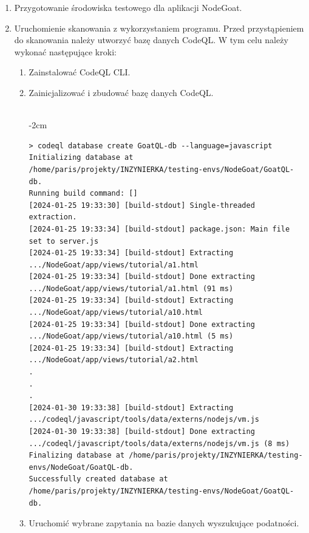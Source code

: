 \begin{enumerate}
    \item Przygotowanie środowiska testowego dla aplikacji NodeGoat.
    
    

    \item Uruchomienie skanowania z wykorzystaniem programu.
    Przed przystąpieniem do skanowania należy utworzyć bazę danych CodeQL. W tym celu należy wykonać następujące kroki:
    \begin{enumerate}
        \item Zainstalować CodeQL CLI.
        \item Zainicjalizować i zbudować bazę danych CodeQL. \\\\
        \scriptsize
        \begin{adjustwidth}
        {-2cm}{}
        \begin{verbatim}
> codeql database create GoatQL-db --language=javascript  
Initializing database at /home/paris/projekty/INZYNIERKA/testing-envs/NodeGoat/GoatQL-db.
Running build command: []
[2024-01-25 19:33:30] [build-stdout] Single-threaded extraction.
[2024-01-25 19:33:34] [build-stdout] package.json: Main file set to server.js
[2024-01-25 19:33:34] [build-stdout] Extracting .../NodeGoat/app/views/tutorial/a1.html
[2024-01-25 19:33:34] [build-stdout] Done extracting .../NodeGoat/app/views/tutorial/a1.html (91 ms)
[2024-01-25 19:33:34] [build-stdout] Extracting .../NodeGoat/app/views/tutorial/a10.html
[2024-01-25 19:33:34] [build-stdout] Done extracting .../NodeGoat/app/views/tutorial/a10.html (5 ms)
[2024-01-25 19:33:34] [build-stdout] Extracting .../NodeGoat/app/views/tutorial/a2.html
.
.
.
[2024-01-30 19:33:38] [build-stdout] Extracting .../codeql/javascript/tools/data/externs/nodejs/vm.js
[2024-01-30 19:33:38] [build-stdout] Done extracting .../codeql/javascript/tools/data/externs/nodejs/vm.js (8 ms)
Finalizing database at /home/paris/projekty/INZYNIERKA/testing-envs/NodeGoat/GoatQL-db.
Successfully created database at /home/paris/projekty/INZYNIERKA/testing-envs/NodeGoat/GoatQL-db.
        \end{verbatim}
      \end{adjustwidth}
        \normalsize
        \item Uruchomić wybrane zapytania na bazie danych wyszukujące podatności.
        

\end{enumerate}
\end{enumerate}
